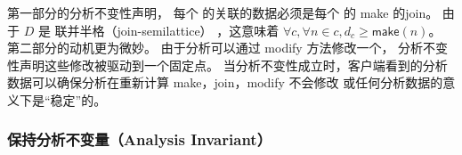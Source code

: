 第一部分的分析不变性声明，
  每个 \eclass 的关联的数据必须是每个 \enode 的 \textsf{make} 的\textsf{join}。
由于 $D$ 是 联并半格（join-semilattice） ，这意味着
  $\forall c, \forall n \in c, d_{c} \geq \textsf{make}(n) $。
第二部分的动机更为微妙。
由于分析可以通过 \textsf{modify} 方法修改一个\eclass，
  分析不变性声明这些修改被驱动到一个固定点。
当分析不变性成立时，客户端看到的分析数据可以确保分析在重新计算
  \textsf{make}，\textsf{join}，\textsf{modify} 不会修改 \egraph 或任何分析数据的意义下是“稳定”的。

\subsubsection{保持分析不变量（Analysis Invariant）}

